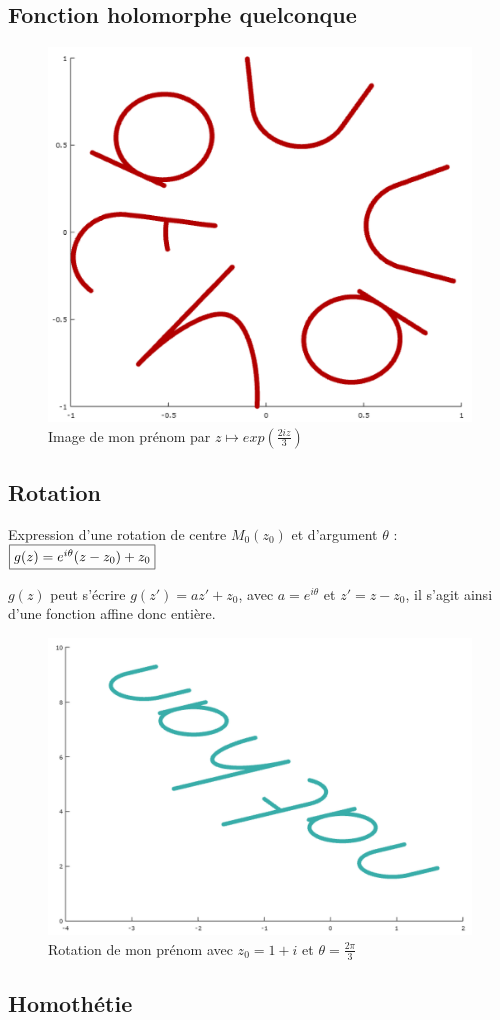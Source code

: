 \documentclass{article}
\begin{document}
    \subsection{Fonction holomorphe quelconque}

    \begin{figure}[ht!]
        \centering
        \includegraphics[height=0.32\textwidth]{figures/name2.png}
        \caption{Image de mon prénom par $z \mapsto exp(\frac{2iz}{3})$}
      \end{figure}


      \subsection{Rotation}

      Expression d'une rotation de centre $M_{0}(z_{0})$ et d'argument $\theta$ : 
      $\fbox{$g(z) = e^{i\theta}(z - z_{0}) + z_{0}$}$

      $g(z)$ peut s'écrire $g(z') = az' + z_{0}$, avec $a = e^{i\theta}$ et $z' = z - z_{0}$, il s'agit
      ainsi d'une fonction affine donc entière.

      \begin{figure}[ht!]
        \centering
        \includegraphics[height=0.32\textwidth]{figures/rotation2.png}
        \caption{Rotation de mon prénom avec $z_{0} = 1 + i$ et $\theta = \frac{2 \pi}{3}$}
      \end{figure}

      \subsection{Homothétie}
\end{document}
